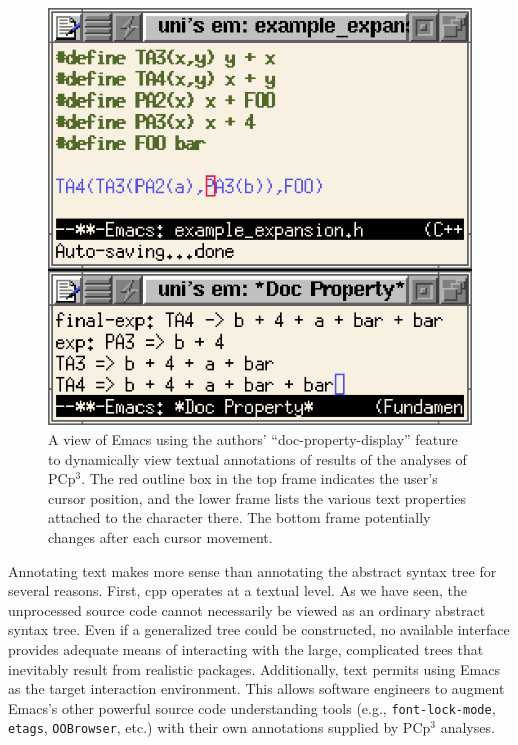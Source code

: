 \documentclass{article}
\newcommand{\pcp}{\mbox{\textsf{PCp}$^3$}}
\newcommand{\Cpp}{\mbox{\textsf{cpp}}}
\newcommand{\eg}{e.g.,}
\newcommand{\etc}{etc}  %
\begin{document}
\begin{figure}[b!]
  \begin{center}
    \leavevmode
    \includegraphics{emacs-xform-view.eps}
    \caption{A view of Emacs using the authors' ``doc-property-display''
      feature to dynamically view textual annotations of results of the
      analyses of \pcp{}.  The red outline box in the top frame
      indicates the user's cursor position, and the lower frame lists the
      various text properties attached to the character there.
      The bottom frame potentially changes after each cursor movement.}
    \label{fig:emacsdocprop}
  \end{center}
\end{figure}


Annotating text makes more sense than annotating the abstract syntax
tree for several reasons.  First, \Cpp{} operates at a textual level.
As we have seen, the unprocessed source code cannot necessarily be
viewed as an ordinary abstract syntax tree.  Even if a generalized tree
could be constructed, no available interface provides adequate means
of interacting with the large, complicated trees that inevitably result
from realistic packages.
Additionally, text permits using Emacs as the target interaction
environment. This allows software engineers to augment Emacs's other
powerful source code understanding tools (\eg{} \texttt{font-lock-mode},
\texttt{etags}, \texttt{OOBrowser}, \etc{}.)  with their own annotations
supplied by \pcp{} analyses.
\end{document}
